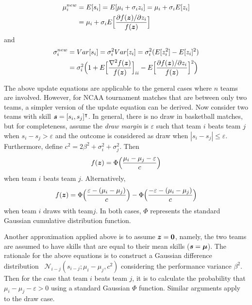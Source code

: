 \begin{equation}\label{Eqn: mu_update}
\begin{split}
\mu_{i}^{new} &= E[s_{i}] = E[\mu_{i} + \sigma_{i}z_{i}] = \mu_{i} + \sigma_{i}E[z_{i}] \\ 
&= \mu_{i} + \sigma_{i}E\Big{[}\frac{\partial f(\bm{z}) / \partial z_{i}}{f(\bm{z})}\Big{]}
\end{split}
\end{equation}
and
\begin{equation}\label{Eqn: sigma_update}
\begin{split}
\sigma_{i}^{new} &= Var[s_{i}] = \sigma_{i}^{2}Var[z_{i}] = \sigma_{i}^{2}(E[z_{i}^{2}] - E[z_{i}]^{2}) \\
&= \sigma_{i}^{2}\Big{(}1 + E\Big{[}\frac{\nabla^{2} f(\bm{z})}{f(\bm{z})}\Big{]}_{ii} - E\Big{[}\frac{\partial f(\bm{z}) / \partial z_{i}}{f(\bm{z})}\Big{]}^{2}\Big{)}
\end{split}
\end{equation}

The above update equations are applicable to the general cases where $n$ teams are involved. However, for NCAA tournament matches that are between only two teams, a simpler version of the update equation can be derived. Now consider two teams with skill $\bm{s} = [s_{i}, s_{j}]^{\intercal}$. In general, there is no draw in basketball matches, but for completeness, assume the \emph{draw margin} is $\varepsilon$ such that team $i$ beats team $j$ when $s_{i} - s_{j} > \varepsilon$ and the outcome is considered as draw when $| s_{i} - s_{j} | \leq \varepsilon$. Furthermore, define $c^{2} = 2\beta^{2} + \sigma_{i}^{2} + \sigma_{j}^{2}$. Then 
\begin{equation}\label{Eqn: win_prob}
f(\bm{z}) = \Phi \Big{(} \frac{\mu_{i} - \mu_{j} - \varepsilon}{c}  \Big{)}
\end{equation}
when team $i$ beats team $j$. Alternatively, 
\begin{equation}
f(\bm{z}) = \Phi \Big{(} \frac{\varepsilon - (\mu_{i} - \mu_{j}) }{c}  \Big{)} - \Phi \Big{(} \frac{- \varepsilon - (\mu_{i} - \mu_{j}) }{c}  \Big{)}
\end{equation}
when team $i$ draws with team$j$. In both cases, $\Phi$ represents the standard Gaussian cumulative distribution function. 

Another approximation applied above is to assume $\bm{z} = \bm{0}$, namely, the two teams are assumed to have skills that are equal to their mean skills ($\bm{s} = \bm{\mu}$). The rationale for the above equations is to construct a Gaussian difference distribution~\cite{WR17} $\mathcal{N}_{i - j}(s_{i - j}; \mu_{i} - \mu_{j}, c^{2})$ considering the performance variance $\beta^{2}$. Then for the case that team $i$ beats team $j$, it is to calculate the probability that $\mu_{i} - \mu_{j} - \varepsilon > 0$ using a standard Gaussian $\Phi$ function. Similar arguments apply to the draw case. 

